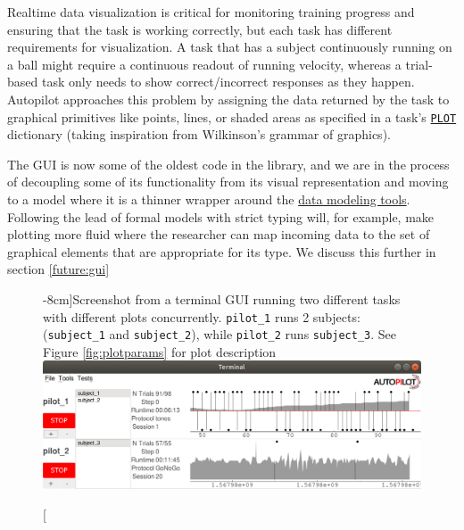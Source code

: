 Realtime data visualization is critical for monitoring training progress and ensuring that the task is working correctly, but each task has different requirements for visualization. A task that has a subject continuously running on a ball might require a continuous readout of running velocity, whereas a trial-based task only needs to show correct/incorrect responses as they happen. Autopilot approaches this problem by assigning the data returned by the task to graphical primitives like points, lines, or shaded areas as specified in a task's \hyperref[sec:taskcomponents]{\texttt{PLOT}} dictionary (taking inspiration from Wilkinson's grammar of graphics\citep{wilkinsonGrammarGraphics2012}).

The GUI is now some of the oldest code in the library, and we are in the process of decoupling some of its functionality from its visual representation and moving to a model where it is a thinner wrapper around the \hyperref[sec:data]{data modeling tools}. Following the lead of formal models with strict typing will, for example, make plotting more fluid where the researcher can map incoming data to the set of graphical elements that are appropriate for its type. We discuss this further in section \ref{future:gui}

\begin{figure}[hb!]
\caption[][-8cm]{Screenshot from a terminal GUI running two different tasks with different plots concurrently. \texttt{pilot\_1} runs 2 subjects: (\texttt{subject\_1} and \texttt{subject\_2}), while \texttt{pilot\_2} runs \texttt{subject\_3}. See Figure \ref{fig:plotparams} for plot description}
\label{fig:gui}
\includegraphics[]{figures/ss_3_nocrop.png}
\end{figure}%
